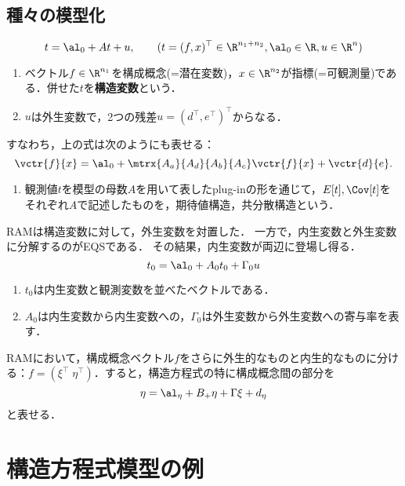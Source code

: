 \documentclass[uplatex,dvipdfmx]{jsreport}
\begin{document}
\subsection{種々の模型化}

\begin{model}[RAMによる模型化]
    \[t=\al_0+At+u,\qquad(t=(f,x)^\top\in\R^{n_1+n_2},\al_0\in\R,u\in\R^n)\]
    \begin{enumerate}
        \item ベクトル$f\in\R^{n_1}$を構成概念(=潜在変数)，$x\in\R^{n_2}$が指標(=可観測量)である．併せた$t$を\textbf{構造変数}という．
        \item $u$は外生変数で，2つの残差$u=(d^\top,e^\top)^\top$からなる．
    \end{enumerate}
    すなわち，上の式は次のようにも表せる：
    \[\vctr{f}{x}=\al_0+\mtrx{A_a}{A_d}{A_b}{A_c}\vctr{f}{x}+\vctr{d}{e}.\]
    \begin{enumerate}
        \item 観測値$t$を模型の母数$A$を用いて表したplug-inの形を通じて，$E[t],\Cov[t]$をそれぞれ$A$で記述したものを，期待値構造，共分散構造という．
    \end{enumerate}
\end{model}

\begin{model}[EQSによる模型化]
    RAMは構造変数に対して，外生変数を対置した．
    一方で，内生変数と外生変数に分解するのがEQSである．
    その結果，内生変数が両辺に登場し得る．
    \[t_0=\al_0+A_0t_0+\Gamma_0u\]
    \begin{enumerate}
        \item $t_0$は内生変数と観測変数を並べたベクトルである．
        \item $A_0$は内生変数から内生変数への，$\Gamma_0$は外生変数から外生変数への寄与率を表す．
    \end{enumerate}
\end{model}

\begin{model}[LISRELによる模型化]
    RAMにおいて，構成概念ベクトル$f$をさらに外生的なものと内生的なものに分ける：$f=(\xi^\top\;\eta^\top)$．すると，構造方程式の特に構成概念間の部分を
    \[\eta=\al_\eta+B_+\eta+\Gamma\xi+d_\eta\]
    と表せる．
\end{model}

\section{構造方程式模型の例}
\end{document}
